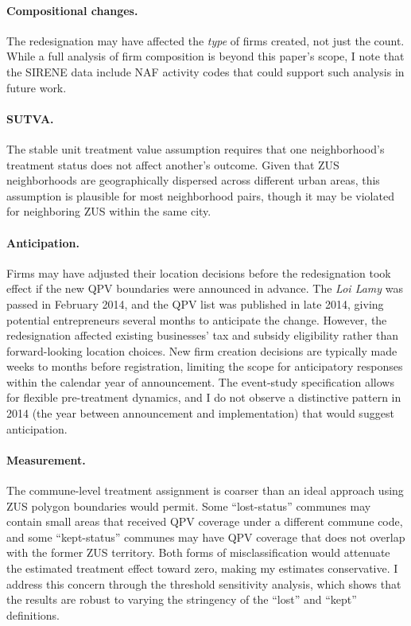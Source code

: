 \documentclass[12pt]{article}
\begin{document}
\paragraph{Compositional changes.} The redesignation may have affected the \textit{type} of firms created, not just the count. While a full analysis of firm composition is beyond this paper's scope, I note that the SIRENE data include NAF activity codes that could support such analysis in future work.

\paragraph{SUTVA.} The stable unit treatment value assumption requires that one neighborhood's treatment status does not affect another's outcome. Given that ZUS neighborhoods are geographically dispersed across different urban areas, this assumption is plausible for most neighborhood pairs, though it may be violated for neighboring ZUS within the same city.

\paragraph{Anticipation.} Firms may have adjusted their location decisions before the redesignation took effect if the new QPV boundaries were announced in advance. The \textit{Loi Lamy} was passed in February 2014, and the QPV list was published in late 2014, giving potential entrepreneurs several months to anticipate the change. However, the redesignation affected existing businesses' tax and subsidy eligibility rather than forward-looking location choices. New firm creation decisions are typically made weeks to months before registration, limiting the scope for anticipatory responses within the calendar year of announcement. The event-study specification allows for flexible pre-treatment dynamics, and I do not observe a distinctive pattern in 2014 (the year between announcement and implementation) that would suggest anticipation.

\paragraph{Measurement.} The commune-level treatment assignment is coarser than an ideal approach using ZUS polygon boundaries would permit. Some ``lost-status'' communes may contain small areas that received QPV coverage under a different commune code, and some ``kept-status'' communes may have QPV coverage that does not overlap with the former ZUS territory. Both forms of misclassification would attenuate the estimated treatment effect toward zero, making my estimates conservative. I address this concern through the threshold sensitivity analysis, which shows that the results are robust to varying the stringency of the ``lost'' and ``kept'' definitions.
\end{document}
